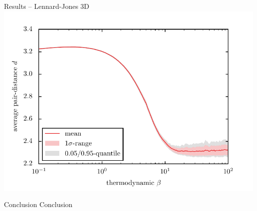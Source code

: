 \documentclass[mathserif,serif]{beamer}
\begin{document}
\begin{frame}{Results -- Lennard-Jones 3D}
	\pause
	\centering
	\includegraphics[width=\textwidth]{../report/figures/temp_dep_lennard_jones3d.pdf}
\end{frame}



\begin{frame}{Conclusion}
	Conclusion
\end{frame}
\end{document}
